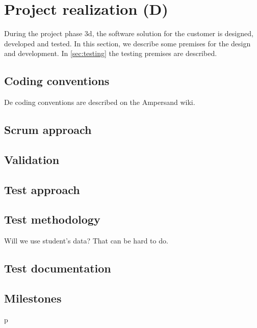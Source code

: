 \section{Project realization (D)}
\label{sec:project-realization}
%
During the project phase 3d, the software solution for the customer is designed, developed and tested.
In this section, we describe some premises for the design and development.
In \autoref{sec:testing} the testing premises are described.

\subsection{Coding conventions}
%
De coding conventions are described on the Ampersand wiki\cite{ampersand-wiki}.

\subsection{Scrum approach}
\lipsum[1]

\subsection{Validation}
\lipsum[1]

\subsection{Test approach}
\lipsum[1]

\subsection{Test methodology}
Will we use student's data? That can be hard to do.

\subsection{Test documentation}
\lipsum[1]

\subsection{Milestones}
\lipsum[1]p

